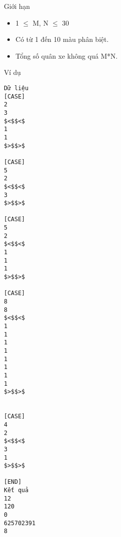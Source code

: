Giới hạn  
\begin{itemize}
	\item     1  $\le$  M, N  $\le$  30   
	\item     Có từ 1 đến 10 màu phân biệt.   
	\item     Tổng số quân xe không quá M*N.   
\end{itemize}
   Ví dụ  
\begin{verbatim}
Dữ liệu
[CASE]
2
3
$<$$<$
1
1
$>$$>$

[CASE]
5
2
$<$$<$
3
$>$$>$

[CASE]
5
2
$<$$<$
1
1
1
$>$$>$

[CASE]
8
8
$<$$<$
1
1
1
1
1
1
1
1
$>$$>$


[CASE]
4
2
$<$$<$
3
1
$>$$>$

[END]
Kết quả
12
120
0
625702391
8
\end{verbatim}